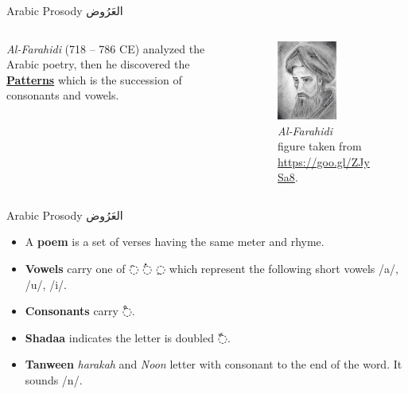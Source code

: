 \begin{frame}[fragile]{Arabic Prosody \textarabic{العَرُوض}}
\begin{columns}
\begin{column}{0.6\textwidth}
	\textit{Al-Farahidi} (718 – 786 CE) analyzed the Arabic poetry, then he discovered the \alert{\underline{\textbf{Patterns}}} which is the succession of consonants and vowels.
\end{column}
\begin{column}{0.4\textwidth}
		\begin{figure}
			\begin{center}
				\includegraphics[width=0.6\textwidth]{Figures/Al-Farahidi.jpg}
				\caption{\textit{Al-Farahidi}\\
{\tiny figure taken from \url{https://goo.gl/ZJySa8}}.}
			\end{center}
		\end{figure}
\end{column}
\end{columns}
\end{frame}

\begin{frame}[fragile]{Arabic Prosody \textarabic{العَرُوض}}

\begin{itemize}
	\item<1-> A \textbf{poem } is a set of verses having the same meter and rhyme.
	\item<2-> \textbf{Vowels}  carry one of \textarabic{◌َ  ◌ُ  ◌ِ} which represent the following short vowels /a/, /u/, /i/.
	\item<3-> \textbf{Consonants} carry \textarabic{◌ْ}.
	\item<4-> \textbf{Shadaa} indicates the letter is doubled \textarabic{◌ّ}. 
	\item<5-> \textbf{Tanween} \textit{harakah} and \textit{Noon} letter with consonant to the end of the word. It sounds /n/.
\end{itemize}

\end{frame}


